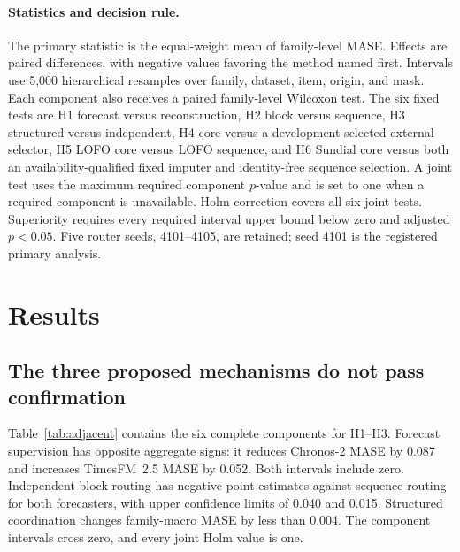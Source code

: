 \documentclass{article}
\begin{document}
\paragraph{Statistics and decision rule.}
The primary statistic is the equal-weight mean of family-level MASE. Effects are paired differences, with negative values favoring the method named first. Intervals use 5,000 hierarchical resamples over family, dataset, item, origin, and mask. Each component also receives a paired family-level Wilcoxon test. The six fixed tests are H1 forecast versus reconstruction, H2 block versus sequence, H3 structured versus independent, H4 core versus a development-selected external selector, H5 LOFO core versus LOFO sequence, and H6 Sundial core versus both an availability-qualified fixed imputer and identity-free sequence selection. A joint test uses the maximum required component $p$-value and is set to one when a required component is unavailable. Holm correction \citep{holm1979simple} covers all six joint tests. Superiority requires every required interval upper bound below zero and adjusted $p<0.05$. Five router seeds, 4101--4105, are retained; seed 4101 is the registered primary analysis.

\section{Results}
\label{sec:results}

\subsection{The three proposed mechanisms do not pass confirmation}

Table~\ref{tab:adjacent} contains the six complete components for H1--H3. Forecast supervision has opposite aggregate signs: it reduces Chronos-2 MASE by 0.087 and increases TimesFM~2.5 MASE by 0.052. Both intervals include zero. Independent block routing has negative point estimates against sequence routing for both forecasters, with upper confidence limits of 0.040 and 0.015. Structured coordination changes family-macro MASE by less than 0.004. The component intervals cross zero, and every joint Holm value is one.
\end{document}
